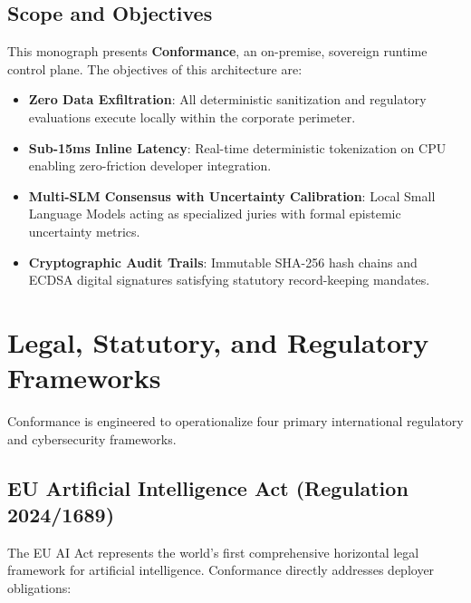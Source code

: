 \documentclass[11pt,a4paper]{article}
\theoremstyle{definition}
\begin{document}
\subsection{Scope and Objectives}
This monograph presents \textbf{Conformance}, an on-premise, sovereign runtime control plane. The objectives of this architecture are:
\begin{itemize}
    \item \textbf{Zero Data Exfiltration}: All deterministic sanitization and regulatory evaluations execute locally within the corporate perimeter.
    \item \textbf{Sub-15ms Inline Latency}: Real-time deterministic tokenization on CPU enabling zero-friction developer integration.
    \item \textbf{Multi-SLM Consensus with Uncertainty Calibration}: Local Small Language Models acting as specialized juries with formal epistemic uncertainty metrics.
    \item \textbf{Cryptographic Audit Trails}: Immutable SHA-256 hash chains and ECDSA digital signatures satisfying statutory record-keeping mandates.
\end{itemize}


\section{Legal, Statutory, and Regulatory Frameworks}
\label{sec:legal}

Conformance is engineered to operationalize four primary international regulatory and cybersecurity frameworks.

\subsection{EU Artificial Intelligence Act (Regulation 2024/1689)}
The EU AI Act represents the world's first comprehensive horizontal legal framework for artificial intelligence. Conformance directly addresses deployer obligations:
\end{document}
